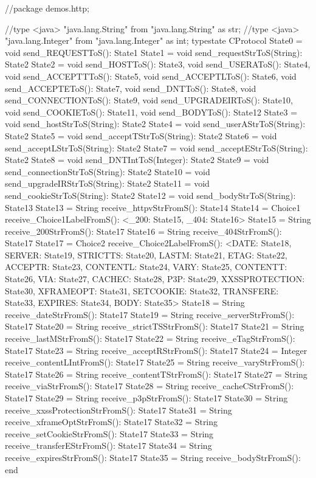 \begin{code}
//package demos.http;

//type <java> "java.lang.String" from "java.lang.String" as str;
//type <java> "java.lang.Integer" from "java.lang.Integer" as int;
typestate CProtocol {
	State0 = {
		void send_REQUESTToS(): State1
	}
	State1 = {
		void send_requestStrToS(String): State2
	}
	State2 = {
		void send_HOSTToS(): State3,
		void send_USERAToS(): State4,
		void send_ACCEPTTToS(): State5,
		void send_ACCEPTLToS(): State6,
		void send_ACCEPTEToS(): State7,
		void send_DNTToS(): State8,
		void send_CONNECTIONToS(): State9,
		void send_UPGRADEIRToS(): State10,
		void send_COOKIEToS(): State11,
		void send_BODYToS(): State12
	}
	State3 = {
		void send_hostStrToS(String): State2
	}
	State4 = {
		void send_userAStrToS(String): State2
	}
	State5 = {
		void send_acceptTStrToS(String): State2
	}
	State6 = {
		void send_acceptLStrToS(String): State2
	}
	State7 = {
		void send_acceptEStrToS(String): State2
	}
	State8 = {
		void send_DNTIntToS(Integer): State2
	}
	State9 = {
		void send_connectionStrToS(String): State2
	}
	State10 = {
		void send_upgradeIRStrToS(String): State2
	}
	State11 = {
		void send_cookieStrToS(String): State2
	}
	State12 = {
		void send_bodyStrToS(String): State13
	}
	State13 = {
		String receive_httpvStrFromS(): State14
	}
	State14 = {
		Choice1 receive_Choice1LabelFromS():
		<_200: State15, _404: State16>
	}
	State15 = {
		String receive_200StrFromS(): State17
	}
	State16 = {
		String receive_404StrFromS(): State17
	}
	State17 = {
		Choice2 receive_Choice2LabelFromS():
		<DATE: State18, SERVER: State19, STRICTTS: State20, LASTM: State21, ETAG: State22, ACCEPTR: State23, CONTENTL: State24, VARY: State25, CONTENTT: State26, VIA: State27, CACHEC: State28, P3P: State29, XXSSPROTECTION: State30, XFRAMEOPT: State31, SETCOOKIE: State32, TRANSFERE: State33, EXPIRES: State34, BODY: State35>
	}
	State18 = {
		String receive_dateStrFromS(): State17
	}
	State19 = {
		String receive_serverStrFromS(): State17
	}
	State20 = {
		String receive_strictTSStrFromS(): State17
	}
	State21 = {
		String receive_lastMStrFromS(): State17
	}
	State22 = {
		String receive_eTagStrFromS(): State17
	}
	State23 = {
		String receive_acceptRStrFromS(): State17
	}
	State24 = {
		Integer receive_contentLIntFromS(): State17
	}
	State25 = {
		String receive_varyStrFromS(): State17
	}
	State26 = {
		String receive_contentTStrFromS(): State17
	}
	State27 = {
		String receive_viaStrFromS(): State17
	}
	State28 = {
		String receive_cacheCStrFromS(): State17
	}
	State29 = {
		String receive_p3pStrFromS(): State17
	}
	State30 = {
		String receive_xxssProtectionStrFromS(): State17
	}
	State31 = {
		String receive_xframeOptStrFromS(): State17
	}
	State32 = {
		String receive_setCookieStrFromS(): State17
	}
	State33 = {
		String receive_transferEStrFromS(): State17
	}
	State34 = {
		String receive_expiresStrFromS(): State17
	}
	State35 = {
		String receive_bodyStrFromS(): end
	}
}\end{code}

